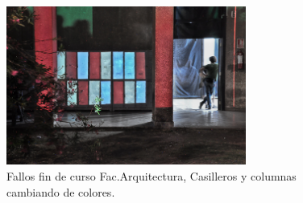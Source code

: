 \begin{figure}[H]
  \centering
    \includegraphics[width=0.7\textwidth]{./Cap7_conclusiones/Arqui3.jpg}
  \caption[Fallos fin de curso Fac.Arquitectura, Casilleros y columnas cambiando de colores]{Fallos fin de curso Fac.Arquitectura, Casilleros y columnas cambiando de colores.}
  \label{fig:Arquitectura3}
\end{figure}

